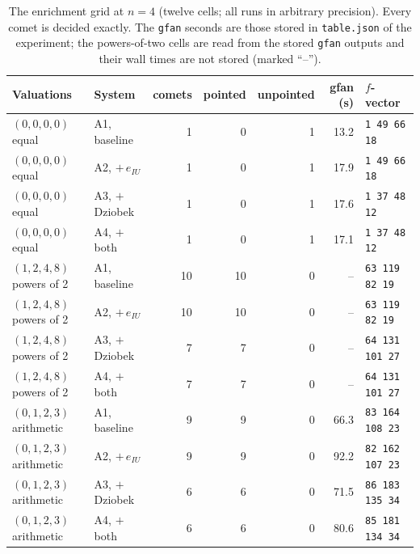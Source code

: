 \documentclass[11pt]{article}
\theoremstyle{definition}
\theoremstyle{remark}
\begin{document}
\begin{table}[t]\centering\footnotesize\setlength{\tabcolsep}{3pt}
\begin{tabular}{@{}llrrrrl@{}}
\toprule
Valuations & System & comets & pointed & unpointed & gfan (s) & $f$-vector \\
\midrule
$(0,0,0,0)$ equal & A1, baseline & 1 & 0 & 1 & 13.2 & \texttt{1 49 66 18} \\
$(0,0,0,0)$ equal & A2, $+\,e_{IU}$ & 1 & 0 & 1 & 17.9 & \texttt{1 49 66 18} \\
$(0,0,0,0)$ equal & A3, $+$ Dziobek & 1 & 0 & 1 & 17.6 & \texttt{1 37 48 12} \\
$(0,0,0,0)$ equal & A4, $+$ both & 1 & 0 & 1 & 17.1 & \texttt{1 37 48 12} \\
\midrule
$(1,2,4,8)$ powers of 2 & A1, baseline & 10 & 10 & 0 & -- & \texttt{63 119 82 19} \\
$(1,2,4,8)$ powers of 2 & A2, $+\,e_{IU}$ & 10 & 10 & 0 & -- & \texttt{63 119 82 19} \\
$(1,2,4,8)$ powers of 2 & A3, $+$ Dziobek & 7 & 7 & 0 & -- & \texttt{64 131 101 27} \\
$(1,2,4,8)$ powers of 2 & A4, $+$ both & 7 & 7 & 0 & -- & \texttt{64 131 101 27} \\
\midrule
$(0,1,2,3)$ arithmetic & A1, baseline & 9 & 9 & 0 & 66.3 & \texttt{83 164 108 23} \\
$(0,1,2,3)$ arithmetic & A2, $+\,e_{IU}$ & 9 & 9 & 0 & 92.2 & \texttt{82 162 107 23} \\
$(0,1,2,3)$ arithmetic & A3, $+$ Dziobek & 6 & 6 & 0 & 71.5 & \texttt{86 183 135 34} \\
$(0,1,2,3)$ arithmetic & A4, $+$ both & 6 & 6 & 0 & 80.6 & \texttt{85 181 134 34} \\
\bottomrule
\end{tabular}
\caption{The enrichment grid at $n=4$ (twelve cells; all runs in arbitrary precision). Every comet is
decided exactly. The \texttt{gfan} seconds are those stored in \texttt{table.json} of the experiment;
the powers-of-two cells are read from the stored \texttt{gfan} outputs and their wall times are
not stored (marked ``--'').}\label{tab:enrich}
\end{table}
\end{document}
